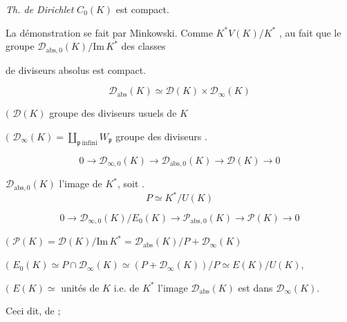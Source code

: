 \documentclass[11pt,a4paper]{article}
\begin{document}

\emph{Th. de Dirichlet} \quad $C_0(K)$ est compact.

La démonstration se fait par Minkowski. Comme $K^{*}V(K)/K^{*}$
\ill{} , \ill{} \ill{} \ill{} \ill{} \ill{} au fait
que le groupe $\mathcal{D}_{\mathrm{abs},0}(K)/\mathrm{Im}\,K^{*}$ des classes

de diviseurs absolus 
\ill{} est compact. \ill{} \ill{} \ill{}

\[
\mathcal{D}_{\mathrm{abs}}(K) \simeq \mathcal{D}(K) \times \mathcal{D}_\infty(K)
\]


$\bigl($ $\mathcal{D}(K)$ groupe des diviseurs usuels de $K$

$\bigl($ $\mathcal{D}_\infty(K) = \coprod_{\mathfrak{p}\ \text{infini}} W_{\mathfrak{p}}$
\quad groupe des diviseurs .

 \ill{} \ill{}
\[
0 \to \mathcal{D}_{\infty,0}(K) \to \mathcal{D}_{\mathrm{abs},0}(K) \to \mathcal{D}(K) \to 0
\]

\ill{} \ill{} \ill{} $\mathcal{D}_{\mathrm{abs},0}(K)$ l'image de $K^{*}$,
soit \struck{\ill{}} .
\[
P \simeq K^{*}/U(K)
\]

\[
0 \to \mathcal{D}_{\infty,0}(K)/E_0(K) \to \mathcal{P}_{\mathrm{abs},0}(K) \to \mathcal{P}(K) \to 0
\]

\ill{} \ill{} 

$\bigl($ $\mathcal{P}(K) = \mathcal{D}(K)/\mathrm{Im}\,K^{*} = \mathcal{D}_{\mathrm{abs}}(K)/P + \mathcal{D}_\infty(K)$

$\bigl($ $E_0(K) \simeq P \cap \mathcal{D}_\infty(K) \simeq (P + \mathcal{D}_\infty(K))/P \simeq E(K)/U(K)$,

$\bigl($ $E(K) \simeq$ unités de $K$ \quad i.e. \ill{} de $K^{*}$ \ill{}
\ill{} l'image \ill{} $\mathcal{D}_{\mathrm{abs}}(K)$ est dans $\mathcal{D}_\infty(K)$.

Ceci dit,  de  
 ; \ill{} \ill{} \ill{}
\end{document}
